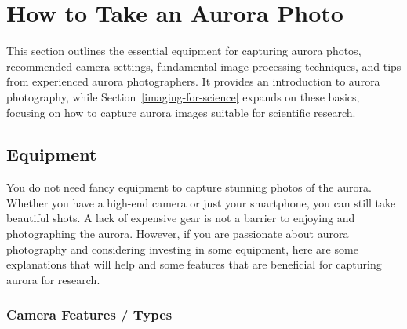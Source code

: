 \documentclass{article}
\newcommand{\contributed}[1]{%
    \par\noindent
    \begingroup
    \setlength{\leftskip}{1em}%
    \itshape
    Contributors: #1
    \par
    \endgroup
    \vspace{0.5em}
}
\begin{document}
\section{How to Take an Aurora Photo} 
This section outlines the essential equipment for capturing aurora photos, recommended camera settings, fundamental image processing techniques, and tips from experienced aurora photographers. It provides an introduction to aurora photography, while Section~\ref{imaging-for-science} expands on these basics, focusing on how to capture aurora images suitable for scientific research.


\subsection{Equipment}

You do not need fancy equipment to capture stunning photos of the aurora. Whether you have a high-end camera or just your smartphone, you can still take beautiful shots. A lack of expensive gear is not a barrier to enjoying and photographing the aurora. However, if you are passionate about aurora photography and considering investing in some equipment, here are some explanations that will help and some features that are beneficial for capturing aurora for research.

\subsubsection{Camera Features / Types}
\end{document}
